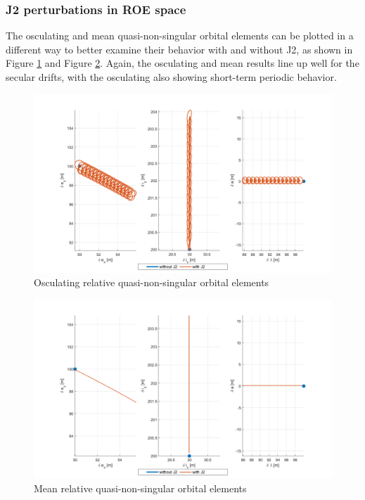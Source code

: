 \subsubsection{J2 perturbations in ROE space}
The osculating and mean quasi-non-singular orbital elements can be plotted in a different way to better examine their behavior with and without J2, as shown in Figure \ref{fig:osc_ROE_proj} and Figure \ref{fig:mean_ROE_proj}. Again, the osculating and mean results line up well for the secular drifts, with the osculating also showing short-term periodic behavior. 

\begin{figure}[H]
    \centering
    \includegraphics[width=0.75\linewidth]{sim/figures/PS4/ROE_projections_osc_SV2.png}
    \caption{Osculating relative quasi-non-singular orbital elements}
    \label{fig:osc_ROE_proj}
\end{figure}
\begin{figure}[H]
    \centering
    \includegraphics[width=0.75\linewidth]{sim/figures/PS4/ROE_projections_mean_SV2.png}
    \caption{Mean relative quasi-non-singular orbital elements}
    \label{fig:mean_ROE_proj}
\end{figure}

